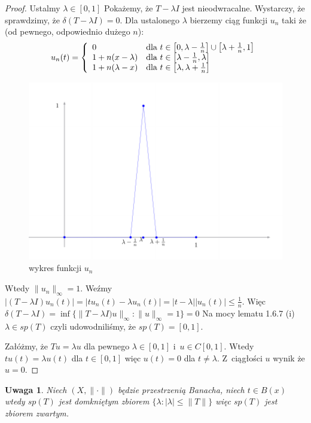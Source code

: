 \documentclass[11pt]{mwrep}
\renewcommand{\[}{\begin{equation}}
\renewcommand{\]}{\end{equation}}
\newcommand{\norm}{\|\cdot\|}
\newcommand{\spac}[1][X]{$(#1,\norm)$ }
\newtheorem{uwaga}[subsection]{Uwaga}
\begin{document}
\begin{proof}
	Ustalmy $\lambda \in [0,1]$ Pokażemy, że $T -\lambda I$ jest nieodwracalne. Wystarczy, że sprawdzimy, że $\delta(T-\lambda I) =0$.
	Dla ustalonego $\lambda$ bierzemy ciąg funkcji $u_n$ taki że (od pewnego, odpowiednio dużego $n$):
	$$u_n(t) = \left\{
		\begin{array}[]{ll}
		 	0 & \textrm{dla } t \in \left[0,\lambda-\frac{1}{n}\right] \cup \left[ \lambda+\frac{1}{n}, 1 \right]\\
			1 + n(x -\lambda) & \textrm{dla } t \in \left[ \lambda-\frac{1}{n},\lambda \right]\\
			1+n(\lambda -x)	& \textrm{dla } t \in \left[ \lambda,\lambda+\frac{1}{n} \right]
		\end{array}\right.
	$$
	\begin{figure}[h]
	  \centering
	  \includegraphics[scale=.7]{rys2}
	  \caption{wykres funkcji $u_n$}
	\end{figure}

	Wtedy $\|u_n\|_\infty=1$. Weźmy $|(T- \lambda I) u_n(t)| = |tu_n(t) - \lambda u_n(t)| = |t-\lambda| |u_n(t)| \le \frac{1}{n}$.
	Więc $\delta(T-\lambda I)  = \inf \{ \|T-\lambda I )u \|_\infty : \|u\|_\infty =1\} = 0$ 
	Na mocy lematu 1.6.7 (i) $\lambda \in sp(T)$ czyli udowodniliśmy, że $sp(T) = [0,1]$. \par
	Załóżmy, że $Tu = \lambda u$ dla pewnego $\lambda \in [0,1]$ i~$u \in C[0,1]$.
	Wtedy $tu(t) = \lambda u(t) $ dla $t\in[0,1]$ więc $u(t) = 0$ dla $t\not = \lambda$. Z~ciągłości $u$ wynik że $u=0$.
\end{proof}
\begin{uwaga}
	Niech \spac będzie przestrzenią Banacha, niech $t\in B(x)$ wtedy $sp (T)$ jest domkniętym zbiorem 
	$\{\lambda : |\lambda| \le \|T\|\}$ więc $sp(T)$ jest zbiorem zwartym.
\end{uwaga}
\end{document}
